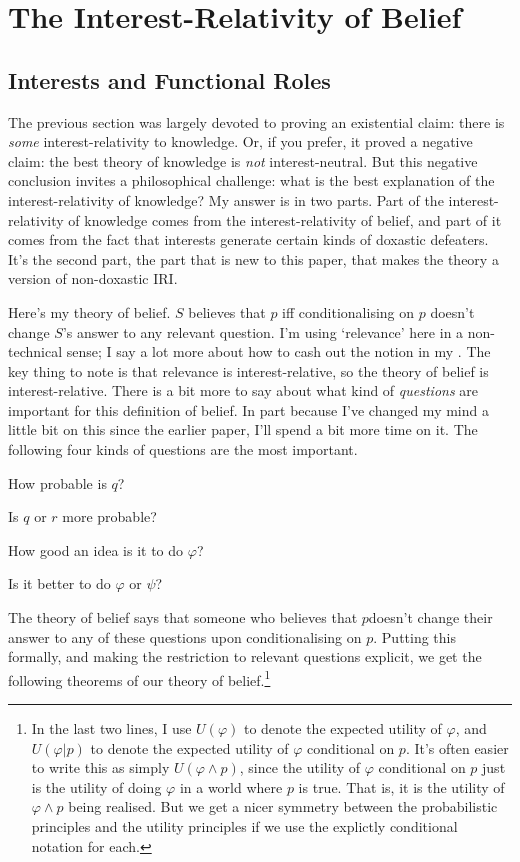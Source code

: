 \documentclass[11pt,oneside]{book}
\begin{document}
\section{The Interest-Relativity of Belief}

\subsection{Interests and Functional Roles}
The previous section was largely devoted to proving an existential claim: there is \textit{some} interest-relativity to knowledge. Or, if you prefer, it proved a negative claim: the best theory of knowledge is \textit{not} interest-neutral. But this negative conclusion invites a philosophical challenge: what is the best explanation of the interest-relativity of knowledge? My answer is in two parts. Part of the interest-relativity of knowledge comes from the interest-relativity of belief, and part of it comes from the fact that interests generate certain kinds of doxastic defeaters. It's the second part, the part that is new to this paper, that makes the theory a version of non-doxastic IRI.

Here's my theory of belief. $S$ believes that $p$ iff conditionalising on $p$ doesn't change $S$'s answer to any relevant question. I'm using `relevance' here in a non-technical sense; I say a lot more about how to cash out the notion in my \citeyearpar{Weatherson2005-WEACWD}. The key thing to note is that relevance is interest-relative, so the theory of belief is interest-relative. There is a bit more to say about what kind of \textit{questions} are important for this definition of belief. In part because I've changed my mind a little bit on this since the earlier paper, I'll spend a bit more time on it. The following four kinds of questions are the most important.

\begin{itemize*}
\item How probable is $q$?
\item Is $q$ or $r$ more probable?
\item How good an idea is it to do $\varphi$?
\item Is it better to do $\varphi$ or $\psi$?
\end{itemize*}

\noindent The theory of belief says that someone who believes that $p$doesn't change their answer to any of these questions upon conditionalising on $p$. Putting this formally, and making the restriction to relevant questions explicit, we get the following theorems of our theory of belief.\footnote{In the last two lines, I use $U(\varphi)$ to denote the expected utility of $\varphi$, and $U(\varphi | p)$ to denote the expected utility of $\varphi$ conditional on $p$. It's often easier to write this as simply $U(\varphi \wedge p)$, since the utility of $\varphi$ conditional on $p$ just is the utility of doing $\varphi$ in a world where $p$ is true. That is, it is the utility of $\varphi \wedge p$ being realised. But we get a nicer symmetry between the probabilistic principles and the utility principles if we use the explictly conditional notation for each.}
\end{document}

